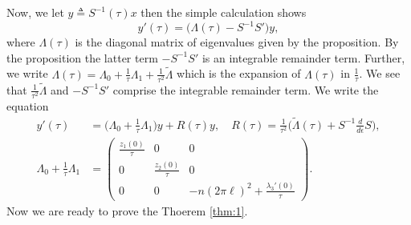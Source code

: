 \documentclass[a4paper,11pt]{article}
\def\l{(2\pi \ell)}
\theoremstyle{remark}
\begin{document}
Now, we let $y\triangleq S^{-1}(\tau)x$ then the simple calculation shows
$$ y'(\tau) = \Big(\Lambda(\tau) - S^{-1}S'\Big) y,$$
where $\Lambda(\tau)$ is the diagonal matrix of eigenvalues given by the proposition. By the proposition the latter term $- S^{-1}S'$ is an integrable remainder term. Further, we write $\Lambda(\tau) = \Lambda_0 + \frac{1}{\tau}\Lambda_1 + \frac{1}{\tau^2}\tilde{\Lambda}$ which is the expansion of $\Lambda(\tau)$ in $\frac{1}{\tau}$. We see that $\frac{1}{\tau^2}\tilde{\Lambda}$ and $- S^{-1}S'$ comprise the integrable remainder term. We write the equation
\begin{align}
y'(\tau) &= \Big(\Lambda_0 + \frac{1}{\tau}\Lambda_1\Big) y + R(\tau) y, \quad R(\tau) = \frac{1}{\tau^2}\Big(\tilde{\Lambda}(\tau)+ S^{-1}\frac{d}{d\epsilon}{S}\Big), \label{eq:diagonalsystem} \\
 \Lambda_0 + \frac{1}{\tau}\Lambda_1 &=
 \begin{pmatrix}
  \frac{z_1(0)}{\tau} & 0 & 0\\
  0 & \frac{z_2(0)}{\tau} & 0\\
  0 & 0 & -n\l^2 + \frac{\lambda_3'(0)}{\tau} \label{eq:order1diag}
 \end{pmatrix}.
\end{align}
Now we are ready to prove the Thoerem \ref{thm:1}.
\end{document}
